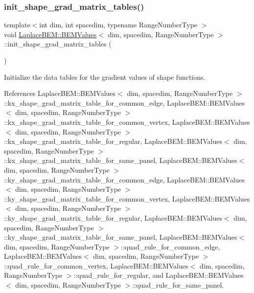 \subsubsection{\texorpdfstring{init\+\_\+shape\+\_\+grad\+\_\+matrix\+\_\+tables()}{init\_shape\_grad\_matrix\_tables()}\hspace{0.1cm}{\footnotesize\ttfamily [1/2]}}
{\footnotesize\ttfamily template$<$int dim, int spacedim, typename Range\+Number\+Type $>$ \\
void \hyperlink{classLaplaceBEM_1_1BEMValues}{Laplace\+B\+E\+M\+::\+B\+E\+M\+Values}$<$ dim, spacedim, Range\+Number\+Type $>$\+::init\+\_\+shape\+\_\+grad\+\_\+matrix\+\_\+tables (\begin{DoxyParamCaption}{ }\end{DoxyParamCaption})\hspace{0.3cm}{\ttfamily [protected]}}

Initialize the data tables for the gradient values of shape functions. 

References Laplace\+B\+E\+M\+::\+B\+E\+M\+Values$<$ dim, spacedim, Range\+Number\+Type $>$\+::kx\+\_\+shape\+\_\+grad\+\_\+matrix\+\_\+table\+\_\+for\+\_\+common\+\_\+edge, Laplace\+B\+E\+M\+::\+B\+E\+M\+Values$<$ dim, spacedim, Range\+Number\+Type $>$\+::kx\+\_\+shape\+\_\+grad\+\_\+matrix\+\_\+table\+\_\+for\+\_\+common\+\_\+vertex, Laplace\+B\+E\+M\+::\+B\+E\+M\+Values$<$ dim, spacedim, Range\+Number\+Type $>$\+::kx\+\_\+shape\+\_\+grad\+\_\+matrix\+\_\+table\+\_\+for\+\_\+regular, Laplace\+B\+E\+M\+::\+B\+E\+M\+Values$<$ dim, spacedim, Range\+Number\+Type $>$\+::kx\+\_\+shape\+\_\+grad\+\_\+matrix\+\_\+table\+\_\+for\+\_\+same\+\_\+panel, Laplace\+B\+E\+M\+::\+B\+E\+M\+Values$<$ dim, spacedim, Range\+Number\+Type $>$\+::ky\+\_\+shape\+\_\+grad\+\_\+matrix\+\_\+table\+\_\+for\+\_\+common\+\_\+edge, Laplace\+B\+E\+M\+::\+B\+E\+M\+Values$<$ dim, spacedim, Range\+Number\+Type $>$\+::ky\+\_\+shape\+\_\+grad\+\_\+matrix\+\_\+table\+\_\+for\+\_\+common\+\_\+vertex, Laplace\+B\+E\+M\+::\+B\+E\+M\+Values$<$ dim, spacedim, Range\+Number\+Type $>$\+::ky\+\_\+shape\+\_\+grad\+\_\+matrix\+\_\+table\+\_\+for\+\_\+regular, Laplace\+B\+E\+M\+::\+B\+E\+M\+Values$<$ dim, spacedim, Range\+Number\+Type $>$\+::ky\+\_\+shape\+\_\+grad\+\_\+matrix\+\_\+table\+\_\+for\+\_\+same\+\_\+panel, Laplace\+B\+E\+M\+::\+B\+E\+M\+Values$<$ dim, spacedim, Range\+Number\+Type $>$\+::quad\+\_\+rule\+\_\+for\+\_\+common\+\_\+edge, Laplace\+B\+E\+M\+::\+B\+E\+M\+Values$<$ dim, spacedim, Range\+Number\+Type $>$\+::quad\+\_\+rule\+\_\+for\+\_\+common\+\_\+vertex, Laplace\+B\+E\+M\+::\+B\+E\+M\+Values$<$ dim, spacedim, Range\+Number\+Type $>$\+::quad\+\_\+rule\+\_\+for\+\_\+regular, and Laplace\+B\+E\+M\+::\+B\+E\+M\+Values$<$ dim, spacedim, Range\+Number\+Type $>$\+::quad\+\_\+rule\+\_\+for\+\_\+same\+\_\+panel.



